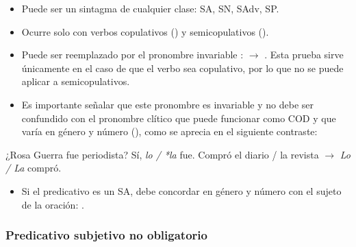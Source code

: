 \begin{itemize}
  \item Puede ser un sintagma de cualquier clase: SA, SN, SAdv, SP.
  \item Ocurre solo con verbos copulativos () y
        semicopulativos ().
  \item Puede ser reemplazado por el pronombre invariable :
         $\rightarrow$ . Esta prueba sirve únicamente en el caso de que el verbo sea
        copulativo, por lo que no se puede aplicar a semicopulativos.
  \item Es importante señalar que este pronombre  es invariable y no
        debe ser confundido con el pronombre clítico que puede funcionar como
        COD y que varía en género y número (), como se
        aprecia en el siguiente contraste:
\end{itemize}

\begin{exe}
  \ex ¿Rosa Guerra fue periodista? Sí, \textit{lo / *la} fue.
  \ex Compró el diario / la revista $\rightarrow$ \textit{Lo / La} compró.
\end{exe}

\begin{itemize}
  \item Si el predicativo es un SA, debe concordar en género y número con el
        sujeto de la oración: .
\end{itemize}

\subsubsection{Predicativo subjetivo no obligatorio}\label{sec:09-psno}


